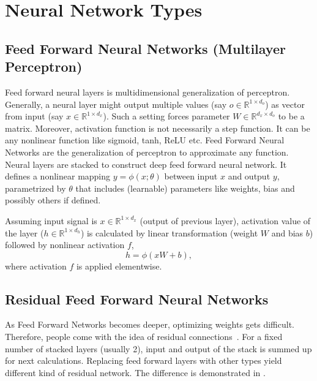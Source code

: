 \section{Neural Network Types}
\label{sec:nnet_types}

\subsection{Feed Forward Neural Networks (Multilayer Perceptron)}

Feed forward neural layers is multidimensional generalization of perceptron. 
Generally, a neural layer might output multiple values (say $o \in \mathbb{R}^{1 \times d_o}$) as vector from input (say $x \in \mathbb{R}^{1 \times d_x}$). 
Such a setting forces parameter $W \in \mathbb{R}^{d_x \times d_o} $ to be a matrix. 
Moreover, activation function is not necessarily a step function. 
It can be any nonlinear function like sigmoid, tanh, ReLU etc. 
Feed Forward Neural Networks are the generalization of perceptron to approximate any function. 
Neural layers are stacked to construct deep feed forward neural network. 
It defines a nonlinear mapping $y=\phi(x;\theta)$ between input $x$ and output $y$, parametrized by $\theta$ that includes (learnable) parameters like weights, bias and possibly others if defined.

Assuming input signal is $x \in \mathbb{R}^{1 \times d_x}$ (output of previous layer), 
activation value of the layer ($h \in \mathbb{R}^{1 \times d_h}$) is calculated by linear transformation (weight $W$ and bias $b$) followed by nonlinear activation $f$, 
\begin{equation}
\label{eqn:mlpact}
h = \phi(x W + b),
\end{equation}
where activation $f$ is applied elementwise.

\subsection{Residual Feed Forward Neural Networks}

As Feed Forward Networks becomes deeper, optimizing weights gets difficult. 
Therefore, people come with the idea of residual connections~\cite{he_deep_2015}. 
For a fixed number of stacked layers (usually 2), input and output of the stack is summed up for next calculations. 
Replacing feed forward layers with other types yield different kind of residual network. 
The difference is demonstrated in . 

